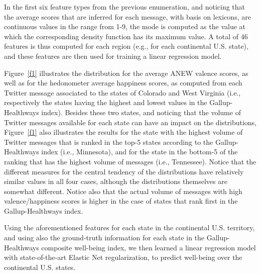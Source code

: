 \documentclass{acm_proc_article-sp}
\begin{document}
In the first six feature types from the previous enumeration, and noticing that the average scores that are inferred for each message, with basis on lexicons, are continuous values in the range from 1-9, the mode is computed as the value at which the corresponding density function has its maximum value. A total of 46 features is thus computed for each region (e.g., for each continental U.S. state), and these features are then used for training a linear regression model.

Figure~\ref{f1} illustrates the distribution for the average ANEW valence scores, as well as for the hedonometer average happiness scores, as computed from each Twitter message associated to the states of Colorado and West Virginia (i.e., respectively the states having the highest and lowest values in the Gallup-Healthways index). Besides these two states, and noticing that the volume of Twitter messages available for each state can have an impact on the distributions, Figure~\ref{f1} also illustrates the results for the state with the highest volume of Twitter messages that is ranked in the top-5 states according to the Gallup-Healthways index (i.e., Minnesota), and for the state in the bottom-5 of the ranking that has the highest volume of messages (i.e., Tennessee). Notice that the different measures for the central tendency of the distributions have relatively similar values in all four cases, although the distributions themselves are somewhat different. Notice also that the actual volume of messages with high valence/happiness scores is higher in the case of states that rank first in the Gallup-Healthways index.

Using the aforementioned features for each state in the continental U.S. territory, and using also the ground-truth information for each state in the Gallup-Healthways composite well-being index, we then learned a linear regression model with state-of-the-art Elastic Net regularization, to predict well-being over the continental U.S. states.
\end{document}
